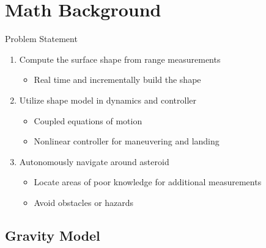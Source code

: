\documentclass[11pt,professionalfonts]{beamer}
\begin{document}
\section[Problem Statement]{Math Background}
\begin{frame}{Problem Statement}
\begin{enumerate}
    \item<1-> Compute the surface shape from range measurements
        \begin{itemize}
            \item Real time and incrementally build the shape
        \end{itemize}
    \item<2-> Utilize shape model in dynamics and controller
        \begin{itemize}
            \item Coupled equations of motion 
            \item Nonlinear controller for maneuvering and landing
        \end{itemize}
    \item<3-> Autonomously navigate around asteroid 
        \begin{itemize}
            \item Locate areas of poor knowledge for additional measurements
            \item Avoid obstacles or hazards
        \end{itemize}
\end{enumerate}
\end{frame}

\subsection[Gravity Model]{Gravity Model}
\end{document}
